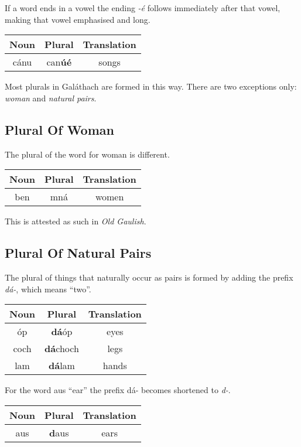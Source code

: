 If a word ends in a vowel the ending \textit{-\'{e}} follows immediately after that vowel, making that vowel emphasised and long.
\begin{table}[H]
\centering
\begin{tabu}{c|c|c}
  \textbf{Noun} & \textbf{Plural} & \textbf{Translation}\\
  \toprule
  c\'{a}nu & can\textbf{\'{u}\'{e}} & songs
\end{tabu}
\label{example_plural_ends_in_vowel}
\end{table}

Most plurals in Gal\'{a}thach are formed in this way. There are two exceptions only: \textit{woman} and \textit{natural pairs}.

\subsection{Plural Of Woman}

The plural of the word for woman is different.
\begin{table}[H]
\centering
\begin{tabu}{c|c|c}
  \textbf{Noun} & \textbf{Plural} & \textbf{Translation}\\
  \toprule
  ben & mn\'{a} & women
\end{tabu}
\label{example_plural_of_woman}
\end{table}

This is attested as such in \textit{Old Gaulish}.

\subsection{Plural Of Natural Pairs}

The plural of things that naturally occur as pairs is formed by adding the prefix \textit{d\'{a}-}, which means ``two''.
\begin{table}[H]
\centering
\begin{tabu}{c|c|c}
  \textbf{Noun} & \textbf{Plural} & \textbf{Translation}\\
  \toprule
  \'{o}p & \textbf{d\'{a}}\'{o}p & eyes\\
  coch & \textbf{d\'{a}}choch & legs\\
  lam & \textbf{d\'{a}}lam & hands
\end{tabu}
\label{example_plural_of_natural_pairs}
\end{table}

For the word aus ``ear'' the prefix d\'{a}- becomes shortened to \textit{d-}.
\begin{table}[H]
\centering
\begin{tabu}{c|c|c}
  \textbf{Noun} & \textbf{Plural} & \textbf{Translation}\\
  \toprule
  aus & \textbf{d}aus & ears
\end{tabu}
\label{example_plural_of_ear}
\end{table}

